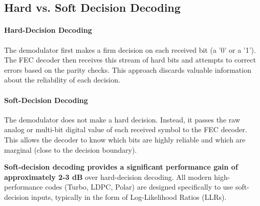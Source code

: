 \subsection{Hard vs. Soft Decision Decoding}

\paragraph{Hard-Decision Decoding}
The demodulator first makes a firm decision on each received bit (a '0' or a '1'). The FEC decoder then receives this stream of hard bits and attempts to correct errors based on the parity checks. This approach discards valuable information about the reliability of each decision.

\paragraph{Soft-Decision Decoding}
The demodulator does not make a hard decision. Instead, it passes the raw analog or multi-bit digital value of each received symbol to the FEC decoder. This allows the decoder to know which bits are highly reliable and which are marginal (close to the decision boundary).
\begin{warningbox}
    \textbf{Soft-decision decoding provides a significant performance gain of approximately 2-3 dB} over hard-decision decoding. All modern high-performance codes (Turbo, LDPC, Polar) are designed specifically to use soft-decision inputs, typically in the form of Log-Likelihood Ratios (LLRs).
\end{warningbox}


